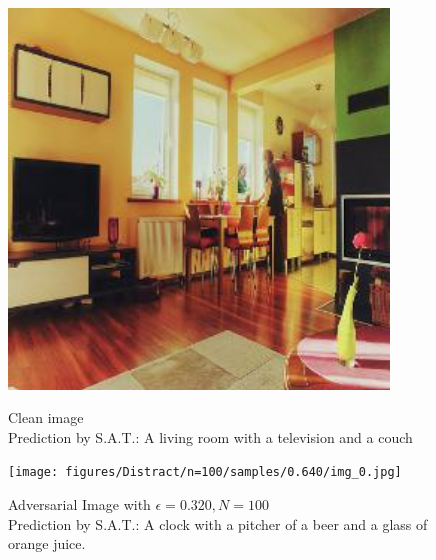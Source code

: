 \begin{figure}[ht]
    \centering
    \begin{minipage}{0.45\textwidth}
        \centering
        \includegraphics[width=0.9\textwidth]{figures/Distract/n=100/samples/0.000/img_0.jpg} %
        \caption*{Clean image\\Prediction by S.A.T.: A living room with a television and a couch}
    \end{minipage}\hfill
    \begin{minipage}{0.45\textwidth}
        \centering
        \texttt{[image: figures/Distract/n=100/samples/0.640/img\_0.jpg]} %
        \caption*{Adversarial Image with $\epsilon=0.320, N=100$\\Prediction by S.A.T.: A clock with a pitcher of a beer and a glass of orange juice.}
    \end{minipage}
\end{figure}